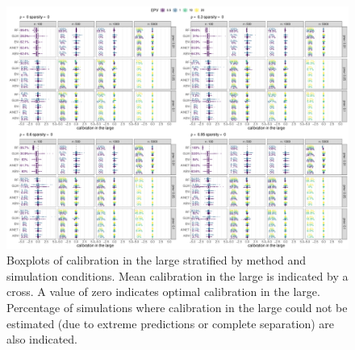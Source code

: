 \documentclass[a4paper, 11pt]{article}
\begin{document}
\begin{landscape}
\begin{figure}[!ht]
\center
\includegraphics[width=0.8\linewidth]{figureS6.pdf}
\caption{Boxplots of calibration in the large stratified by method and
  simulation conditions. Mean calibration in the large is indicated by a cross.
  A value of zero indicates optimal calibration in the large. Percentage of
  simulations where calibration in the large could not be estimated (due to
  extreme predictions or complete separation) are also
  indicated.} \label{fig:clarge}
\end{figure}
\end{landscape}
\end{document}
